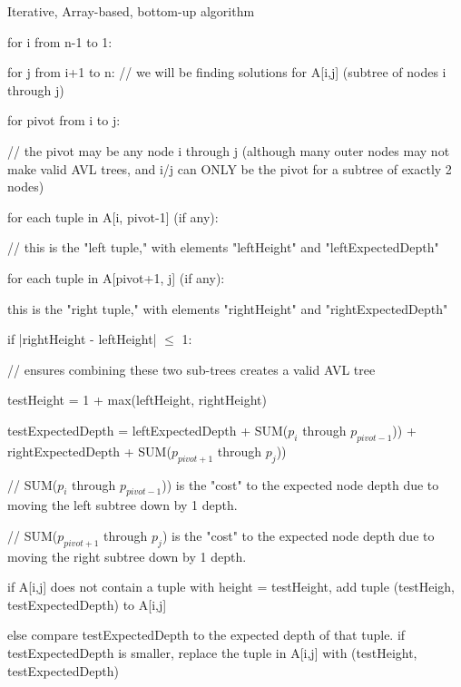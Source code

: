 \documentclass[a4paper]{article}
\begin{document}
Iterative, Array-based, bottom-up algorithm
\begin{myEnumerate}
\item for i from n-1 to 1:
\begin{myEnumerate}
\item for j from i+1 to n: // we will be finding solutions for A[i,j] (subtree of nodes i through j)
\begin{myEnumerate}
\item for pivot from i to j:
    \begin{myEnumerate}
    \item // the pivot may be any node i through j (although many outer nodes may not make valid AVL trees, and i/j can ONLY be the pivot for a subtree of exactly 2 nodes)
    \item for each tuple in A[i, pivot-1] (if any):
        \begin{myEnumerate}
        \item // this is the "left tuple," with elements "leftHeight" and "leftExpectedDepth"
        \item for each tuple in A[pivot+1, j] (if any):
            \begin{myEnumerate}
            \item this is the "right tuple," with elements "rightHeight" and "rightExpectedDepth"
            \item if |rightHeight - leftHeight| $\leq$ 1: 
                \begin{myEnumerate}
                \item // ensures combining these two sub-trees creates a valid AVL tree
                \item testHeight = 1 + max(leftHeight, rightHeight)
                \item testExpectedDepth = leftExpectedDepth + SUM($p_i$ through $p_{pivot-1}$)) + rightExpectedDepth + SUM($p_{pivot+1}$ through $p_{j}$))
                \item // SUM($p_i$ through $p_{pivot-1}$)) is the "cost" to the expected node depth due to moving the left subtree down by 1 depth.
                \item // SUM($p_{pivot+1}$ through $p_{j}$) is the "cost" to the expected node depth due to moving the right subtree down by 1 depth.
                \item if A[i,j] does not contain a tuple with height = testHeight, add tuple (testHeigh, testExpectedDepth) to A[i,j]
                \item else compare testExpectedDepth to the expected depth of that tuple. if testExpectedDepth is smaller, replace the tuple in A[i,j] with (testHeight, testExpectedDepth)
                \end{myEnumerate}
            \end{myEnumerate}
        \end{myEnumerate}
    \end{myEnumerate}
\end{myEnumerate}
\end{myEnumerate}
\end{myEnumerate}
                        
\end{document}
